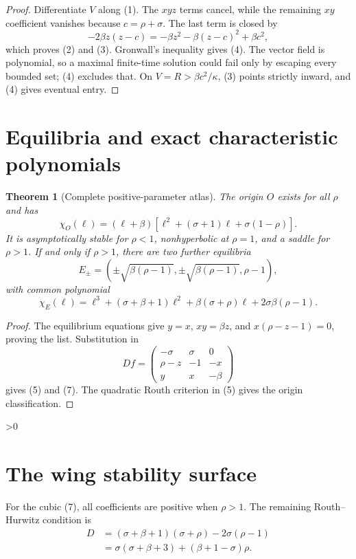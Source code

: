 \documentclass[11pt]{article}
\newtheorem{theorem}{Theorem}
\begin{document}
\begin{proof}
Differentiate $V$ along (1).  The $xyz$ terms cancel, while the remaining
$xy$ coefficient vanishes because $c=\rho+\sigma$.  The last term is closed
by
\[
 -2\beta z(z-c)=-\beta z^2-\beta(z-c)^2+\beta c^2,
\]
which proves (2) and (3).  Gronwall's inequality gives (4).  The vector field
is polynomial, so a maximal finite-time solution could fail only by escaping
every bounded set; (4) excludes that.  On $V=R>\beta c^2/\kappa$, (3) points
strictly inward, and (4) gives eventual entry.
\end{proof}

\section{Equilibria and exact characteristic polynomials}
\begin{theorem}[Complete positive-parameter atlas]\label{thm:atlas}
The origin $O$ exists for all $\rho$ and has
\begin{equation}
 \chi_O(\ell)=(\ell+\beta)
 [\ell^2+(\sigma+1)\ell+\sigma(1-\rho)].               \tag{5}
\end{equation}
It is asymptotically stable for $\rho<1$, nonhyperbolic at $\rho=1$, and a
saddle for $\rho>1$.  If and only if $\rho>1$, there are two further
equilibria
\begin{equation}
 E_\pm=(\pm\sqrt{\beta(\rho-1)},
        \pm\sqrt{\beta(\rho-1)},\rho-1),                \tag{6}
\end{equation}
with common polynomial
\begin{equation}
 \chi_E(\ell)=\ell^3+(\sigma+\beta+1)\ell^2
 +\beta(\sigma+\rho)\ell+2\sigma\beta(\rho-1).         \tag{7}
\end{equation}
\end{theorem}

\begin{proof}
The equilibrium equations give $y=x$, $xy=\beta z$, and
$x(\rho-z-1)=0$, proving the list.  Substitution in
\[
 Df=\begin{pmatrix}-\sigma&\sigma&0\\
 \rho-z&-1&-x\\y&x&-\beta\end{pmatrix}
\]
gives (5) and (7).  The quadratic Routh criterion in (5) gives the origin
classification.
\end{proof}

\ifnum\CRevisionRound>0
\section{The wing stability surface}
For the cubic (7), all coefficients are positive when $\rho>1$.  The remaining
Routh--Hurwitz condition is
\begin{equation}
\begin{aligned}
 D&=(\sigma+\beta+1)(\sigma+\rho)-2\sigma(\rho-1)\\
  &=\sigma(\sigma+\beta+3)+(\beta+1-\sigma)\rho.
\end{aligned}                                           \tag{8}
\end{equation}
\end{document}

